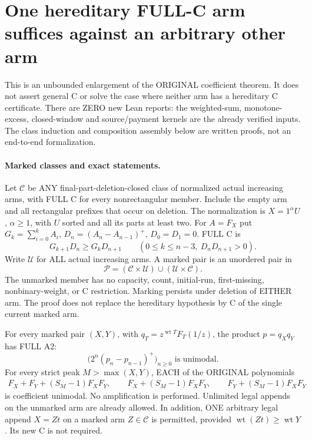 \section{One hereditary FULL-C arm suffices against an arbitrary other arm}
This is an unbounded enlargement of the ORIGINAL coefficient theorem.
It does not assert general C or solve the case where neither arm has
a hereditary C certificate. There are ZERO new Lean reports: the
weighted-sum, monotone-excess, closed-window and source/payment kernels
are the already verified inputs. The class induction and composition
assembly below are written proofs, not an end-to-end formalization.

\paragraph{Marked classes and exact statements.}
Let $\mathcal C$ be ANY final-part-deletion-closed class of normalized
actual increasing arms, with FULL C for every nonrectangular member.
Include the empty arm and all rectangular prefixes that occur on deletion.
The normalization is $X=1^\alpha U$, $\alpha\ge1$, with $U$ sorted and
all its parts at least two. For $A=F_X$ put $G_k=\sum_{i=0}^k A_i$,
$D_n=(A_n-A_{n-1})^+$, $D_0=D_1=0$. FULL C is
\[
 G_{k+1}D_n\ge G_kD_{n+1}
 \qquad(0\le k\le n-3,\ D_nD_{n+1}>0).                 \tag{C}
\]
Write $\mathcal U$ for ALL actual increasing arms. A marked pair is
an unordered pair in
\[
          \mathcal P=(\mathcal C\times\mathcal U)
                         \cup(\mathcal U\times\mathcal C).
\]
The unmarked member has no capacity, count, initial-run, first-missing,
nonbinary-weight, or C restriction. Marking persists under deletion
of EITHER arm. The proof does not replace the hereditary hypothesis
by C of the single current marked arm.

\begin{theorem}
For every marked pair $(X,Y)$, with $q_T=z^{\operatorname{wt}T}F_T(1/z)$,
the product $p=q_Xq_Y$ has FULL A2:
\[
                  \bigl(2^n(p_n-p_{n-1})^+\bigr)_{n\ge0}
                    \text{ is unimodal.}                         \tag{1}
\]
For every strict peak $M>\max(X,Y)$, EACH of the ORIGINAL polynomials
\[
\begin{split}
 F_X+F_Y+(S_M-1)F_XF_Y,\qquad
 F_X+(S_M-1)F_XF_Y,\qquad F_Y+(S_M-1)F_XF_Y
\end{split}                                                       \tag{2}
\]
is coefficient unimodal. No amplification is performed.
Unlimited legal appends on the unmarked arm are already allowed.
In addition, ONE arbitrary legal append $X=Zt$ on a marked arm
$Z\in\mathcal C$ is permitted, provided
$\operatorname{wt}(Zt)\ge\operatorname{wt}Y$. Its new C is not required.
\end{theorem}

